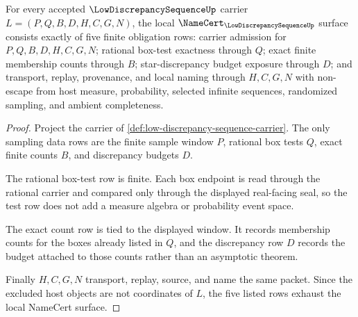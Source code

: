 \begin{theorem}
\label{thm:low-discrepancy-sequence-namecert-obligations}
For every accepted $\LowDiscrepancySequenceUp$ carrier $L=(P,Q,B,D,H,C,G,N)$, the local $\NameCert_{\LowDiscrepancySequenceUp}$ surface consists exactly of five finite obligation rows: carrier admission for $P,Q,B,D,H,C,G,N$; rational box-test exactness through $Q$; exact finite membership counts through $B$; star-discrepancy budget exposure through $D$; and transport, replay, provenance, and local naming through $H,C,G,N$ with non-escape from host measure, probability, selected infinite sequences, randomized sampling, and ambient completeness.
\end{theorem}
\begin{proof}
Project the carrier of \autoref{def:low-discrepancy-sequence-carrier}. The only sampling data rows are the finite sample window $P$, rational box tests $Q$, exact finite counts $B$, and discrepancy budgets $D$.

The rational box-test row is finite. Each box endpoint is read through the rational carrier and compared only through the displayed real-facing seal, so the test row does not add a measure algebra or probability event space.

The exact count row is tied to the displayed window. It records membership counts for the boxes already listed in $Q$, and the discrepancy row $D$ records the budget attached to those counts rather than an asymptotic theorem.

Finally $H,C,G,N$ transport, replay, source, and name the same packet. Since the excluded host objects are not coordinates of $L$, the five listed rows exhaust the local NameCert surface.
\end{proof}

